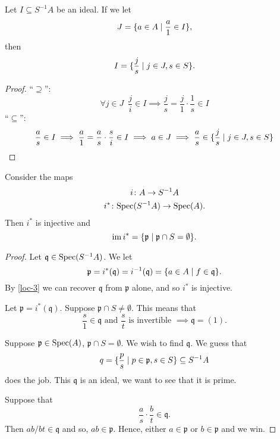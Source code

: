 
\begin{lemma}
  \label{loc-3}
  Let $I \subseteq S^{-1}A$ be an ideal. If we let
  \[ J = \{ a \in A \mathrel{|} \frac{a}{1} \in I \}, \]
  then
  \[ I = \{ \frac{j}{s} \mathrel{|} j \in J, s \in S\}. \]
\end{lemma}
\begin{proof}
  ``$\supseteq$'':
  \[ \forall j \in J \enspace \frac{j}{i} \in I \implies \frac{j}{s} = \frac{j}{1} \cdot \frac{1}{s} \in I \]
  ``$\subseteq$'':
  \[ \frac{a}{s} \in I \implies \frac{a}{1} = \frac{a}{s} \cdot \frac{s}{i} \in I \implies a \in J \implies \frac{a}{s} \in \{\frac{j}{s} \mathrel{|} j \in J, s \in S \}\]
\end{proof}

\begin{prop}
  \label{loc-2}
  Consider the maps
  \begin{gather*}
    i \colon A \to S^{-1}A \\
    i^* \colon \text{Spec}(S^{-1}A) \to \text{Spec}(A).
  \end{gather*}
  Then $i^*$ is injective and
  \[ \operatorname*{im} i^* = \{ \mathfrak p \mathrel{|} \mathfrak p \cap S = \emptyset \}. \]
\end{prop}
\begin{proof}
  Let $\mathfrak q \in \text{Spec}(S^{-1}A)$. We let
  \[ \mathfrak p = i^*(\mathfrak q) = i^{-1}(\mathfrak q) = \{a \in A \mathrel{|} f \in \mathfrak q \}.\]
  By \cref{loc-3} we can recover $\mathfrak q$ from $\mathfrak p$ alone, and so $i^*$ is injective.

  Let
  $\mathfrak p = i^* (\mathfrak q)$.
  Suppose
  $\mathfrak p \cap S \neq \emptyset$.
  This means that
  \[\frac{s}{1} \in \mathfrak q \text{ and } \frac{s}{t}  \text{ is invertible } \implies \mathfrak q = (1).\]

  Suppose $\mathfrak p \in \text{Spec}(A)$, $\mathfrak p \cap S = \emptyset$.
  We wish to find $\mathfrak q$. We guess that
  \[ q = \{ \frac{p}{s} \mathrel{|} p \in \mathfrak p, s \in S \} \subseteq S^{-1}A\]
  does the job.
  This $\mathfrak q$ is an ideal, we want to see that it is prime.

  Suppose that
  \[ \frac{a}{s} \cdot \frac{b}{t} \in \mathfrak q .\]
  Then
  $ab / {bt} \in \mathfrak q$
  and so, \(ab \in \mathfrak{p}.\) Hence, either \(a \in \mathfrak{p}\) or \(b \in \mathfrak{p}\) and we win.
\end{proof}

